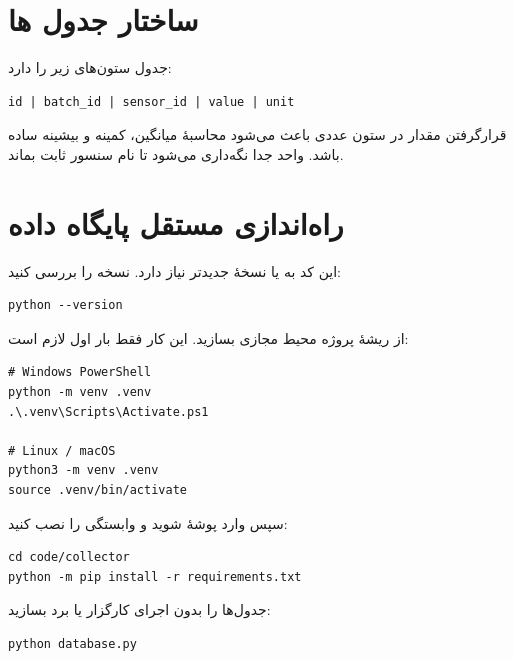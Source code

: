\section{ساختار جدول
ها}
جدول
ستون‌های زیر را دارد:

\begin{LTR}
\begin{lstlisting}
id | batch_id | sensor_id | value | unit
\end{lstlisting}
\end{LTR}

قرارگرفتن مقدار در ستون عددی
باعث می‌شود محاسبهٔ میانگین، کمینه و بیشینه ساده باشد. واحد جدا نگه‌داری می‌شود تا نام سنسور ثابت بماند.

\section{راه‌اندازی مستقل پایگاه داده}
این کد به
یا نسخهٔ جدیدتر نیاز دارد. نسخه را بررسی کنید:

\begin{LTR}
\begin{lstlisting}
python --version
\end{lstlisting}
\end{LTR}

از ریشهٔ پروژه محیط مجازی بسازید. این کار فقط بار اول لازم است:

\begin{LTR}
\begin{lstlisting}
# Windows PowerShell
python -m venv .venv
.\.venv\Scripts\Activate.ps1

# Linux / macOS
python3 -m venv .venv
source .venv/bin/activate
\end{lstlisting}
\end{LTR}

سپس وارد پوشهٔ
شوید و وابستگی را نصب کنید:

\begin{LTR}
\begin{lstlisting}
cd code/collector
python -m pip install -r requirements.txt
\end{lstlisting}
\end{LTR}

جدول‌ها را بدون اجرای کارگزار یا برد بسازید:

\begin{LTR}
\begin{lstlisting}
python database.py
\end{lstlisting}
\end{LTR}

